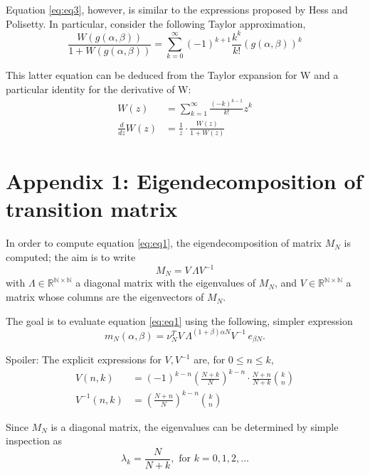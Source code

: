 \documentclass{article}
\newcommand{\N}{\mathbb{N}}
\newcommand{\R}{\mathbb{R}}
\newcommand{\ppar}[1]{\left( #1 \right)}
\begin{document}
Equation \eqref{eq:eq3}, however, is similar to the expressions proposed by Hess and Polisetty. In particular, consider the following Taylor approximation,
\begin{equation}
    \frac{W\ppar{g\ppar{\alpha, \beta}}}{1+W\ppar{g\ppar{\alpha, \beta}}}
    =
    \sum_{k=0}^{\infty}
    (-1)^{k+1} \frac{k^k}{k!} 
    \ppar{g\ppar{\alpha, \beta}}^k
\end{equation}

This latter equation can be deduced from the Taylor expansion for W and a particular identity for the derivative of W:
\begin{align}
    W(z) 
    &=
    \sum_{k=1}^\infty 
    \frac{(-k)^{k-1}}{k!} z^k \\
    \frac{d}{dz} W(z) 
    &=
    \frac{1}{z} \cdot \frac{W(z)}{1+W(z)}
\end{align}

\section{Appendix 1: Eigendecomposition of transition matrix}

In order to compute equation \eqref{eq:eq1}, the eigendecomposition of matrix $M_N$ is computed; the aim is to write
\begin{equation}
    M_N = V\, \Lambda V^{-1}
\end{equation}
with $\Lambda \in \R^{\N \times \N}$ a diagonal matrix with the eigenvalues of $M_N$, and $V\in \R^{\N \times \N}$ a matrix whose columns are the eigenvectors of $M_N$. 

The goal is to evaluate equation \eqref{eq:eq1} using the following, simpler expression
\begin{equation}
    m_N(\alpha, \beta) = \nu_N^T V\, \Lambda^{(1+\beta) \alpha N} V^{-1}\, e_{\beta N}.
\end{equation}

Spoiler: The explicit expressions for $V, V^{-1}$ are, for $0\leq n\leq k$, 
\begin{align}
    V(n,k) &= (-1)^{k-n} \ppar{\frac{N+k}{N}}^{k-n} \cdot \frac{N+n}{N+k} \binom{k}{n}
    \\
    V^{-1}(n,k) &=
    \ppar{\frac{N+n}{N}}^{k-n} \binom{k}{n}
\end{align}

Since $M_N$ is a diagonal matrix, the eigenvalues can be determined by simple inspection as
\begin{equation}
    \lambda_k = \frac{N}{N+k}, \text{ for } k=0, 1, 2, \dots
\end{equation}
\end{document}
